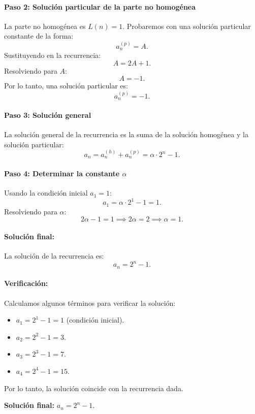 \documentclass{article}
\begin{document}
\paragraph{Paso 2: Solución particular de la parte no homogénea}
La parte no homogénea es $L(n) = 1$. Probaremos con una solución particular constante de la forma:
\[
a_n^{(p)} = A.
\]
Sustituyendo en la recurrencia:
\[
A = 2A + 1.
\]
Resolviendo para $A$:
\[
A = -1.
\]
Por lo tanto, una solución particular es:
\[
a_n^{(p)} = -1.
\]

\paragraph{Paso 3: Solución general}
La solución general de la recurrencia es la suma de la solución homogénea y la solución particular:
\[
a_n = a_n^{(h)} + a_n^{(p)} = \alpha \cdot 2^n - 1.
\]

\paragraph{Paso 4: Determinar la constante $\alpha$}
Usando la condición inicial $a_1 = 1$:
\[
a_1 = \alpha \cdot 2^1 - 1 = 1.
\]
Resolviendo para $\alpha$:
\[
2\alpha - 1 = 1 \implies 2\alpha = 2 \implies \alpha = 1.
\]

\paragraph{Solución final:}
La solución de la recurrencia es:
\[
a_n = 2^n - 1.
\]

\paragraph{Verificación:}
Calculamos algunos términos para verificar la solución:
\begin{itemize}
    \item $a_1 = 2^1 - 1 = 1$ (condición inicial).
    \item $a_2 = 2^2 - 1 = 3$.
    \item $a_3 = 2^3 - 1 = 7$.
    \item $a_4 = 2^4 - 1 = 15$.
\end{itemize}

Por lo tanto, la solución coincide con la recurrencia dada.

\begin{center}
    \textbf{Solución final:} $a_n = 2^n - 1$.
\end{center}
\end{document}
